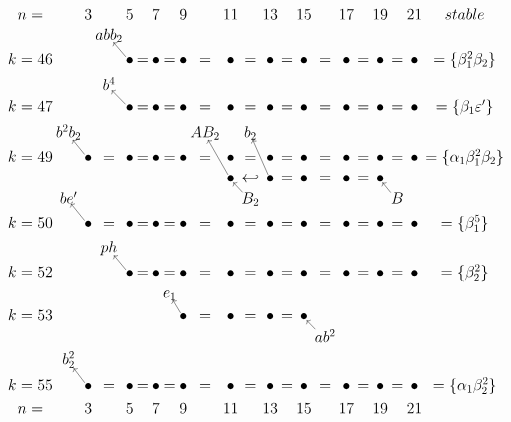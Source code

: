 \documentclass{article}
\begin{document}
\(
\begin{tikzcd}[
nodes={font=\Large,inner sep=0pt},
row sep=0.3cm,
column sep=0.1cm,
column 16/.append style={nodes={align=left,anchor=west}}
]
n= & & 3 & & 5 & & 7 & & 9 & & 11 & & 13 & & 15 & & 17 & & 19 & & 21 & stable & \\
& & & abb_2 & & \\ 
k=46 & & & & \bullet \arrow[lu] & = & \bullet & = & \bullet & = & \bullet & = & \bullet & = & \bullet & = & \bullet & = & \bullet & = & \bullet & = \{\beta_1^2\beta_2\} \\
& & & b^4 & & \\
k=47 & & & & \bullet \arrow[lu] & = & \bullet & = & \bullet & = & \bullet & = & \bullet & = & \bullet & = & \bullet & = & \bullet & = & \bullet & = \{\beta_1\varepsilon'\}  \\
& b^2b_2 && && && && AB_2 && b_2 \\ 
k=49 & & \bullet \arrow[lu] & = & \bullet & = & \bullet & = & \bullet & = & \bullet & = & \bullet & = & \bullet & = & \bullet & = & \bullet & = & \bullet & = \{\alpha_1\beta_1^2\beta_2\} \\
&& && && && && \bullet\arrow[luu] & \hookleftarrow & \bullet\arrow[luu] & = & \bullet & = & \bullet & = & \bullet \\
& be'  && && && && && B_2\arrow[lu] && && && && B\arrow[lu] \\ 
k=50 & & \bullet \arrow[lu] & = & \bullet & = & \bullet & = & \bullet & = & \bullet & = & \bullet & = & \bullet & = & \bullet & = & \bullet & = & \bullet & = \{\beta_1^5\} \\
& && ph & &  \\
k=52 && && \bullet \arrow[lu] & = & \bullet & = & \bullet & = & \bullet & = & \bullet & = & \bullet & = & \bullet & = & \bullet & = & \bullet & = \{\beta_2^2\} \\
& && && && e_1 &&  \\
k=53 & & & & & & & & \bullet\arrow[lu] & = & \bullet & = & \bullet & = & \bullet && && && && &  \\
& && && && && && && && ab^2\arrow[lu] \\
& b_2^2  && && && && && && && && && \\ 
k=55 & & \bullet \arrow[lu] & = & \bullet & = & \bullet & = & \bullet & = & \bullet & = & \bullet & = & \bullet & = & \bullet & = & \bullet & = & \bullet & = \{\alpha_1\beta_2^2\} \\
n= & & 3 & & 5 & & 7 & & 9 & & 11 & & 13 & & 15 & & 17 & & 19 & & 21 \\
\end{tikzcd}
\)
\end{document}
